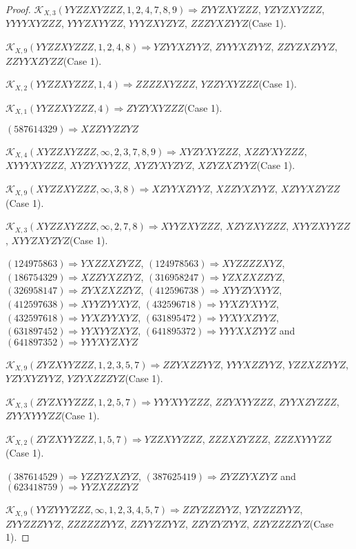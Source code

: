\documentclass[12pt]{article}
\theoremstyle{plain}
\theoremstyle{definition}
\theoremstyle{remark}
\newcommand{\fancy}[1]{\mathcal{#1}}
\def\K{\fancy{K}}
\begin{document}
\begin{proof}
	
	$\K_{X,3}(YYZZXYZZZ,1, 2, 4, 7, 8, 9)\Rightarrow $$ZYYZXYZZZ$, $YZYZXYZZZ$, $YYYYXYZZZ$, $YYYZXYYZZ$, $YYYZXYZYZ$, $ZZZYXZYYZ$(Case 1).
	
	$\K_{X,9}(YYZZXYZZZ,1, 2, 4, 8)\Rightarrow $$YZYYXZYYZ$, $ZYYYXZYYZ$, $ZZYZXZYYZ$, $ZZYYXZYZZ$(Case 1).
	
	$\K_{X,2}(YYZZXYZZZ,1, 4)\Rightarrow $$ZZZZXYZZZ$, $YZZYXYZZZ$(Case 1).
	
	$\K_{X,1}(YYZZXYZZZ,4)\Rightarrow $$ZYZYXYZZZ$(Case 1).
	
	
	
	$(5 8 7 6 1 4 3 2 9)\Rightarrow XZZYYZZYZ$
	
	
	$\K_{X,4}(XYZZXYZZZ,\infty,2, 3, 7, 8, 9)\Rightarrow $$XYZYXYZZZ$, $XZZYXYZZZ$, $XYYYXYZZZ$, $XYZYXYYZZ$, $XYZYXYZYZ$, $XZYZXZYYZ$(Case 1).
	
	$\K_{X,9}(XYZZXYZZZ,\infty,3, 8)\Rightarrow $$XZYYXZYYZ$, $XZZYXZYYZ$, $XZYYXZYZZ$(Case 1).
	
	$\K_{X,3}(XYZZXYZZZ,\infty,2, 7, 8)\Rightarrow $$XYYZXYZZZ$, $XZYZXYZZZ$, $XYYZXYYZZ$, $XYYZXYZYZ$(Case 1).
	
	
	
	$(1 2 4 9 7 5 8 6 3)\Rightarrow YXZZXZYZZ$, $(1 2 4 9 7 8 5 6 3)\Rightarrow XYZZZZXYZ$, $(1 8 6 7 5 4 3 2 9)\Rightarrow XZZYXZZYZ$, $(3 1 6 9 5 8 2 4 7)\Rightarrow YZXZXZZYZ$, $(3 2 6 9 5 8 1 4 7)\Rightarrow ZYXZXZZYZ$, $(4 1 2 5 9 6 7 3 8)\Rightarrow XYYZYXYYZ$, $(4 1 2 5 9 7 6 3 8)\Rightarrow XYYZYYXYZ$, $(4 3 2 5 9 6 7 1 8)\Rightarrow YYXZYXYYZ$, $(4 3 2 5 9 7 6 1 8)\Rightarrow YYXZYYXYZ$, $(6 3 1 8 9 5 4 7 2)\Rightarrow YYXYXZYYZ$, $(6 3 1 8 9 7 4 5 2)\Rightarrow YYXYYZXYZ$, $(6 4 1 8 9 5 3 7 2)\Rightarrow YYYXXZYYZ$ and $(6 4 1 8 9 7 3 5 2)\Rightarrow YYYXYZXYZ$
	
	
	$\K_{X,9}(ZYZXYYZZZ,1, 2, 3, 5, 7)\Rightarrow $$ZZYXZZYYZ$, $YYYXZZYYZ$, $YZZXZZYYZ$, $YZYXYZYYZ$, $YZYXZZZYZ$(Case 1).
	
	$\K_{X,3}(ZYZXYYZZZ,1, 2, 5, 7)\Rightarrow $$YYYXYYZZZ$, $ZZYXYYZZZ$, $ZYYXZYZZZ$, $ZYYXYYYZZ$(Case 1).
	
	$\K_{X,2}(ZYZXYYZZZ,1, 5, 7)\Rightarrow $$YZZXYYZZZ$, $ZZZXZYZZZ$, $ZZZXYYYZZ$(Case 1).
	
	
	
	$(3 8 7 6 1 4 5 2 9)\Rightarrow YZZYZXZYZ$, $(3 8 7 6 2 5 4 1 9)\Rightarrow ZYZZYXZYZ$ and $(6 2 3 4 1 8 7 5 9)\Rightarrow YYZXZZZYZ$
	
	
	$\K_{X,9}(YYZYYYZZZ,\infty,1, 2, 3, 4, 5, 7)\Rightarrow $$ZZYZZZYYZ$, $YZYZZZYYZ$, $ZYYZZZYYZ$, $ZZZZZZYYZ$, $ZZYYZZYYZ$, $ZZYZYZYYZ$, $ZZYZZZZYZ$(Case 1).
	

\end{proof}
\end{document}
